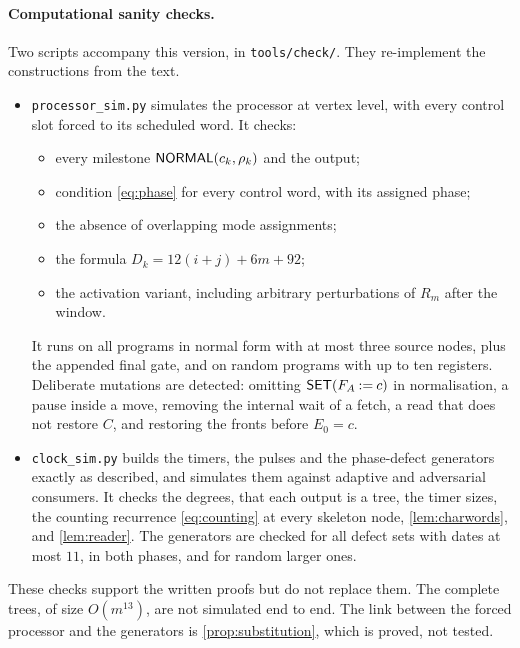 \paragraph{Computational sanity checks.} Two scripts accompany this version, in
\texttt{tools/check/}. They re-implement the constructions from the text.
\begin{itemize}
\item \texttt{processor\_sim.py} simulates the processor at vertex level, with every control slot
  forced to its scheduled word. It checks:
  \begin{itemize}
  \item every milestone $\textsf{NORMAL}(c_k,\rho_k)$ and the output;
  \item condition \eqref{eq:phase} for every control word, with its assigned phase;
  \item the absence of overlapping mode assignments;
  \item the formula $D_k=12(i+j)+6m+92$;
  \item the activation variant, including arbitrary perturbations of $R_m$ after the window.
  \end{itemize}
  It runs on all programs in normal form with at most three source nodes, plus the appended final
  gate, and on random programs with up to ten registers. Deliberate mutations are detected: omitting
  $\textsf{SET}(F_A\mathbin{:=}c)$ in normalisation, a pause inside a move, removing the internal
  wait of a fetch, a read that does not restore $C$, and restoring the fronts before $E_0=c$.
\item \texttt{clock\_sim.py} builds the timers, the pulses and the phase-defect generators exactly as
  described, and simulates them against adaptive and adversarial consumers. It checks the degrees,
  that each output is a tree, the timer sizes, the counting recurrence \eqref{eq:counting} at every
  skeleton node, \cref{lem:charwords}, and \cref{lem:reader}. The generators are checked for all defect
  sets with dates at most $11$, in both phases, and for random larger ones.
\end{itemize}
These checks support the written proofs but do not replace them. The complete trees, of size
$O(m^{13})$, are not simulated end to end. The link between the forced processor and the
generators is \cref{prop:substitution}, which is proved, not tested.
